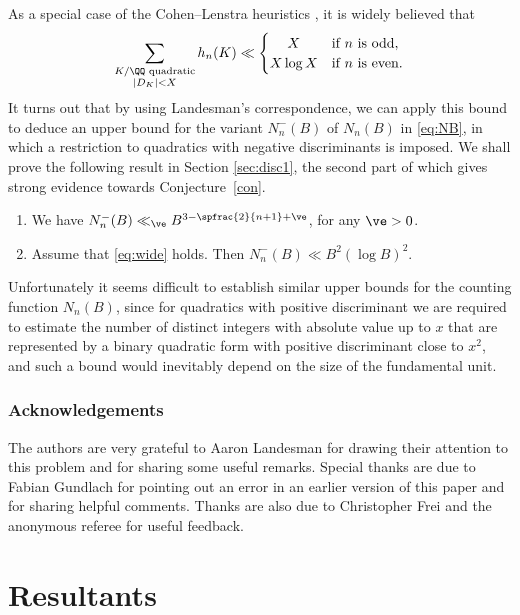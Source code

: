 As a special case of the Cohen--Lenstra heuristics \cite{CL},
it is widely believed that
\begin{equation}\label{eq:wide}
\sum_{
\substack{K/\QQ \text{ quadratic}\\
|D_K|<X
}} h_n(K)\ll
\begin{cases}
\hfil X&\text{if $n$ is odd},\\
\hfil X\log X&\text{if $n$ is even}.
\end{cases}
\end{equation}
It turns out that by using Landesman's correspondence, we can
apply this bound to deduce an upper bound for the variant $N_n^-(B)$ of $N_n(B)$ in \eqref{eq:NB}, in which a restriction to quadratics with
negative discriminants is imposed.
We shall prove the following result in Section \ref{sec:disc1}, the second part of which gives strong evidence towards Conjecture~\ref{con}.

\skpt
\begin{theorem}\label{t:lama}
\begin{enumerate}
\item
We have $N_n^-(B)\ll_\ve
B^{3-\spfrac{2}{n+1}+\ve}$,
for any $\ve>0$.
\item
Assume that \eqref{eq:wide} holds. Then $N_n^-(B)\ll B^2(\log B)^2$.
\end{enumerate}
\end{theorem}

Unfortunately it seems difficult to establish similar upper bounds for the counting function $N_n(B)$, since for quadratics with positive discriminant we are required to
estimate the number of distinct integers with absolute value up to $x$ that are represented by a binary quadratic form with positive discriminant close to $x^2$, and such a bound would inevitably depend on the size of the fundamental unit.

\subsubsection*{Acknowledgements}
The authors are very grateful to Aaron Landesman
for drawing their attention to this problem and for sharing some useful remarks.
Special thanks are due to Fabian Gundlach for pointing out an error in an earlier version of this paper and for sharing helpful comments. Thanks are also due to
Christopher Frei and the anonymous referee for useful feedback.

\section{Resultants}

